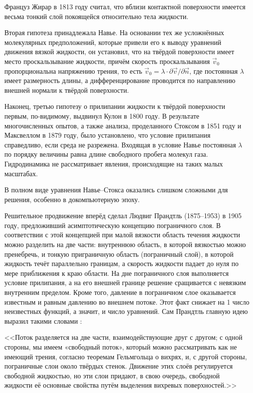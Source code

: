 Француз Жирар в 1813 году считал, что вблизи контактной поверхности имеется весьма тонкий слой покоящейся 
относительно тела жидкости.

Вторая гипотеза принадлежала Навье. На основании тех же усложнённых молекулярных предположений, которые 
привели его к выводу уравнений движения вязкой жидкости, он установил, что на твёрдой поверхности имеет 
место проскальзывание жидкости, причём скорость проскальзывания $\vec{v}_0$ пропорциональна напряжению 
трения, то есть $\vec{v}_0=\lambda \cdot \partial \vec v / \partial \vec n$, где постоянная $\lambda$ 
имеет размерность длины, а дифференцирование проводится по направлению внешней нормали к твёрдой поверхности.

Наконец, третью гипотезу о прилипании жидкости к твёрдой поверхности первым, по-видимому, выдвинул Кулон в 
1800 году. В результате многочисленных опытов, а также анализа, проделанного Стоксом в 1851 году и 
Максвеллом в 1879 году, было установлено, что условие прилипания справедливо, если среда не разрежена. 
Входящая в условие Навье постоянная $\lambda$ по порядку величины равна длине свободного пробега молекул 
газа. Гидродинамика не рассматривает явления, происходящие на таких малых масштабах.

В полном виде уравнения Навье--Стокса оказались слишком сложными для решения, особенно в докомпьютерную эпоху.

Решительное продвижение вперёд сделал Людвиг Прандтль (1875--1953) в 1905 году, предложивший асимптотическую 
концепцию пограничного слоя. В соответствии с этой концепцией при малой вязкости область течения жидкости
 можно разделить на две части: внутреннюю область, в которой вязкостью можно пренебречь, и тонкую приграничную
  область (пограничный слой), в которой жидкость течёт параллельно границам, а скорость жидкости падает до 
  нуля по мере приближения к краю области. На дне пограничного слоя выполняется условие прилипания, а на его 
  внешней границе решение сращивается с невязким внутренним пределом. Кроме того, давление в пограничном 
  слое оказывается известным и равным давлению во внешнем потоке. Этот факт снижает на 1 число неизвестных 
  функций, а значит, и число уравнений. Сам Прандтль главную идею выразил такими словами \cite{betyaev}:

<<Поток разделяется на две части, взаимодействующие друг с другом; с одной стороны, мы имеем «свободный поток», 
который можно рассматривать как не имеющий трения, согласно теоремам Гельмгольца о вихрях, и, с другой стороны, 
пограничные слои около твёрдых стенок. Движение этих слоёв регулируется свободной жидкостью, но эти слои придают,
в свою очередь, свободной жидкости её основные свойства путём выделения вихревых поверхностей.>>

